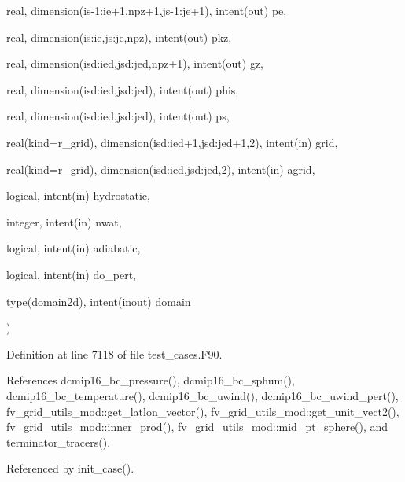{\begin{DoxyParamCaption}
\item[{real, dimension(is-\/1\-:ie+1,npz+1,js-\/1\-:je+1), intent(out)}]{pe, }
\item[{real, dimension(is\-:ie,js\-:je,npz), intent(out)}]{pkz, }
\item[{real, dimension(isd\-:ied,jsd\-:jed,npz+1), intent(out)}]{gz, }
\item[{real, dimension(isd\-:ied,jsd\-:jed), intent(out)}]{phis, }
\item[{real, dimension(isd\-:ied,jsd\-:jed), intent(out)}]{ps, }
\item[{real(kind=r\-\_\-grid), dimension(isd\-:ied+1,jsd\-:jed+1,2), intent(in)}]{grid, }
\item[{real(kind=r\-\_\-grid), dimension(isd\-:ied,jsd\-:jed,2), intent(in)}]{agrid, }
\item[{logical, intent(in)}]{hydrostatic, }
\item[{integer, intent(in)}]{nwat, }
\item[{logical, intent(in)}]{adiabatic, }
\item[{logical, intent(in)}]{do\-\_\-pert, }
\item[{type(domain2d), intent(inout)}]{domain}
\end{DoxyParamCaption}
)\hspace{0.3cm}{\ttfamily [private]}}\label{classtest__cases__mod_ab293a7f2a292363f96b322a4482026a2}


Definition at line 7118 of file test\-\_\-cases.\-F90.



References dcmip16\-\_\-bc\-\_\-pressure(), dcmip16\-\_\-bc\-\_\-sphum(), dcmip16\-\_\-bc\-\_\-temperature(), dcmip16\-\_\-bc\-\_\-uwind(), dcmip16\-\_\-bc\-\_\-uwind\-\_\-pert(), fv\-\_\-grid\-\_\-utils\-\_\-mod\-::get\-\_\-latlon\-\_\-vector(), fv\-\_\-grid\-\_\-utils\-\_\-mod\-::get\-\_\-unit\-\_\-vect2(), fv\-\_\-grid\-\_\-utils\-\_\-mod\-::inner\-\_\-prod(), fv\-\_\-grid\-\_\-utils\-\_\-mod\-::mid\-\_\-pt\-\_\-sphere(), and terminator\-\_\-tracers().



Referenced by init\-\_\-case().

